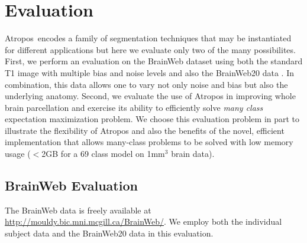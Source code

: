 \documentclass[11pt,english]{article}
\begin{document}
\section{Evaluation}
Atropos~encodes a family of segmentation techniques that may be
instantiated for different applications but here we evaluate only two
of the many possibilites. First, we perform an evaluation on the
BrainWeb dataset using both the standard T1 image with multiple bias
and noise levels and also the BrainWeb20 data
\citep{Aubert-Broche2006a,Battaglini2008}.  In combination, this data
allows one to vary not only noise and bias but also the underlying
anatomy.  Second, we evaluate the use of Atropos in improving whole
brain parcellation and exercise its ability to efficiently solve {\em
many class} expectation maximization problem.  We choose this
evaluation problem in part to illustrate the flexibility of Atropos
and also the benefits of the novel, efficient implementation that
allows many-class problems to be solved with low memory usage ($<$2GB
for a 69 class model on 1mm$^3$ brain data).


\subsection{BrainWeb Evaluation}
\label{sec:bweb} The BrainWeb data is freely available at
\url{http://mouldy.bic.mni.mcgill.ca/BrainWeb/}.  We employ both the
individual subject data and the BrainWeb20 data in this evaluation.
\end{document}
